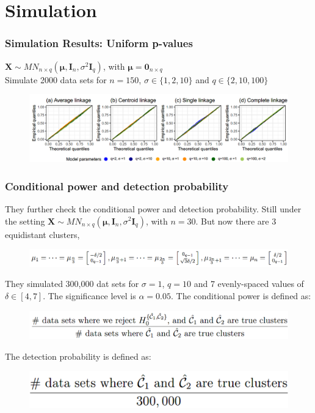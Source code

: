 \documentclass{beamer}
\begin{document}
	\section{Simulation}
	\begin{frame}
		\frametitle{Simulation Results: Uniform p-values}
		$\bm{X}\sim MN_{n\times q}(\bm{\mu}, \bm{I}_n, \sigma^2\bm{I}_q)$, with $\bm{\mu} = \bm{0}_{n \times q}$\\
		Simulate 2000 data sets for $n = 150$, $\sigma \in \{1, 2, 10\}$ and $q \in \{2, 10, 100\}$
		\begin{figure}
			\includegraphics[width=1\linewidth]{image023.png}
		\end{figure}
	\end{frame}
	
	
	\begin{frame}
		\frametitle{Conditional power and detection probability}
		They further check the conditional power and detection probability. Still under the setting $\bm{X}\sim MN_{n\times q}(\bm{\mu}, \bm{I}_n, \sigma^2\bm{I}_q)$, with $n = 30$. But now there are 3 equidistant clusters,
		\begin{figure}
			\includegraphics[width=1\linewidth]{image024.png}
		\end{figure}
		They simulated 300,000 dat sets for $\sigma=1$, $q = 10$ and 7 evenly-spaced values of $\delta\in [4,7]$. The significance level is $\alpha = 0.05$.
		The conditional power is defined as:
		\begin{figure}
			\includegraphics[width=.9\linewidth]{image025.png}
		\end{figure}
		The detection probability is defined as: 
		\begin{figure}
			\includegraphics[width=.6\linewidth]{image026.png}
		\end{figure}
	\end{frame}
	
\end{document}
